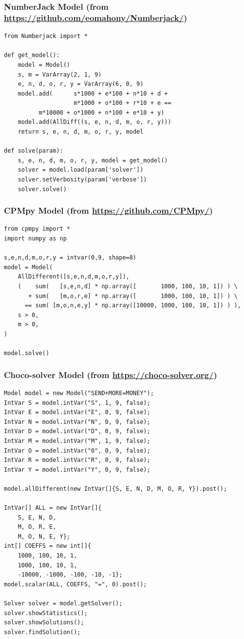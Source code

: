 \begin{frame}[fragile]
\frametitle{NumberJack Model {\tiny(from \url{https://github.com/eomahony/Numberjack/})}}
\label{sendmore:numberjack}
\tiny
\begin{verbatim}
from Numberjack import *

def get_model():
    model = Model()
    s, m = VarArray(2, 1, 9)  
    e, n, d, o, r, y = VarArray(6, 0, 9)  
    model.add(      s*1000 + e*100 + n*10 + d +
                    m*1000 + o*100 + r*10 + e ==
          m*10000 + o*1000 + n*100 + e*10 + y)
    model.add(AllDiff((s, e, n, d, m, o, r, y)))
    return s, e, n, d, m, o, r, y, model

def solve(param):
    s, e, n, d, m, o, r, y, model = get_model()
    solver = model.load(param['solver'])
    solver.setVerbosity(param['verbose'])
    solver.solve()
\end{verbatim}
\hyperlink{sendmore:continue}{}
\end{frame}

\begin{frame}[fragile]
\frametitle{CPMpy Model {\tiny(from \url{https://github.com/CPMpy/})}}
\label{sendmore:cpmpy}
\tiny
\begin{verbatim}
from cpmpy import *
import numpy as np

s,e,n,d,m,o,r,y = intvar(0,9, shape=8)
model = Model(
    AllDifferent([s,e,n,d,m,o,r,y]),
    (    sum(   [s,e,n,d] * np.array([       1000, 100, 10, 1]) ) \
       + sum(   [m,o,r,e] * np.array([       1000, 100, 10, 1]) ) \
      == sum( [m,o,n,e,y] * np.array([10000, 1000, 100, 10, 1]) ) ),
    s > 0,
    m > 0,
)

model.solve()
\end{verbatim}
\hyperlink{sendmore:continue}{}
\end{frame}

\begin{frame}[fragile]
\frametitle{Choco-solver Model {\tiny(from \url{https://choco-solver.org/})}}
\label{sendmore:choco}
\tiny
\begin{verbatim}
Model model = new Model("SEND+MORE=MONEY");
IntVar S = model.intVar("S", 1, 9, false);
IntVar E = model.intVar("E", 0, 9, false);
IntVar N = model.intVar("N", 0, 9, false);
IntVar D = model.intVar("D", 0, 9, false);
IntVar M = model.intVar("M", 1, 9, false);
IntVar O = model.intVar("0", 0, 9, false);
IntVar R = model.intVar("R", 0, 9, false);
IntVar Y = model.intVar("Y", 0, 9, false);

model.allDifferent(new IntVar[]{S, E, N, D, M, O, R, Y}).post();

IntVar[] ALL = new IntVar[]{
    S, E, N, D,
    M, O, R, E,
    M, O, N, E, Y};
int[] COEFFS = new int[]{
    1000, 100, 10, 1,
    1000, 100, 10, 1,
    -10000, -1000, -100, -10, -1};
model.scalar(ALL, COEFFS, "=", 0).post();

Solver solver = model.getSolver();
solver.showStatistics();
solver.showSolutions();
solver.findSolution();
\end{verbatim}
\hyperlink{sendmore:continue}{}

\end{frame}



